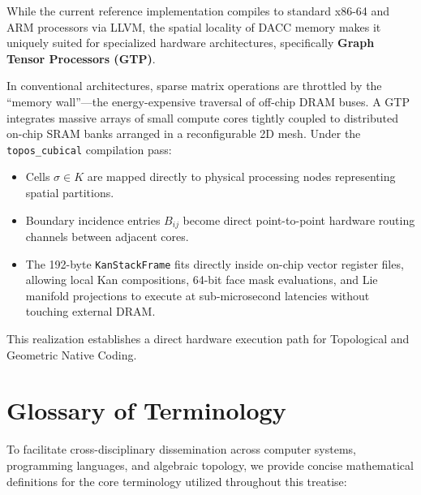 \documentclass[acmsmall,screen,nonacm]{acmart}
\newcommand{\KSF}{\texttt{KanStackFrame}}
\begin{document}
While the current reference implementation compiles to standard x86-64 and ARM processors via LLVM, the spatial locality of DACC memory makes it uniquely suited for specialized hardware architectures, specifically \textbf{Graph Tensor Processors (GTP)}.

In conventional architectures, sparse matrix operations are throttled by the ``memory wall''---the energy-expensive traversal of off-chip DRAM buses. A GTP integrates massive arrays of small compute cores tightly coupled to distributed on-chip SRAM banks arranged in a reconfigurable 2D mesh. Under the \texttt{topos\_cubical} compilation pass:
\begin{itemize}
    \item Cells $\sigma \in K$ are mapped directly to physical processing nodes representing spatial partitions.
    \item Boundary incidence entries $B_{ij}$ become direct point-to-point hardware routing channels between adjacent cores.
    \item The 192-byte \KSF{} fits directly inside on-chip vector register files, allowing local Kan compositions, 64-bit face mask evaluations, and Lie manifold projections to execute at sub-microsecond latencies without touching external DRAM.
\end{itemize}
This realization establishes a direct hardware execution path for Topological and Geometric Native Coding.

\section*{Glossary of Terminology}
\label{sec:glossary}

To facilitate cross-disciplinary dissemination across computer systems, programming languages, and algebraic topology, we provide concise mathematical definitions for the core terminology utilized throughout this treatise:
\end{document}
